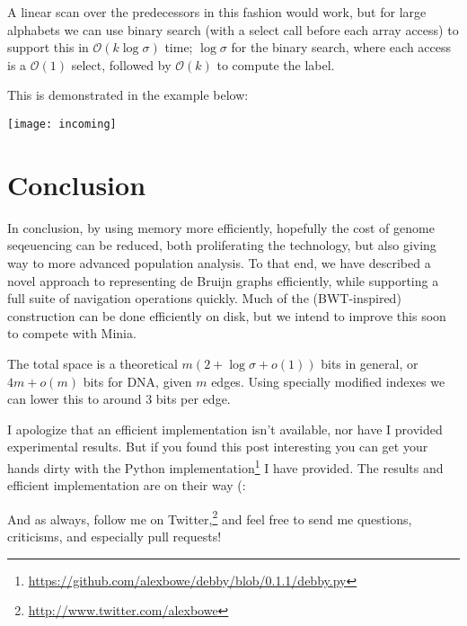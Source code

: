A linear scan over the predecessors in this fashion would work, but for large alphabets we can use binary search (with a select call before each array access) to support this in $\mathcal{O}(k\log\sigma)$ time; $\log\sigma$ for the binary search, where each access is a $\mathcal{O}(1)$ select, followed by $\mathcal{O}(k)$ to compute the label.

This is demonstrated in the example below:

\medskip\centerline{\texttt{[image: incoming]}}\medskip

\section{Conclusion}\label{bl-sec:conc}

In conclusion, by using memory more efficiently, hopefully the cost of genome seqeuencing can be reduced, both proliferating the technology, but also giving way to more advanced population analysis. To that end, we have described a novel approach to representing de Bruijn graphs efficiently, while supporting a full suite of navigation operations quickly. Much of the (BWT-inspired) construction can be done efficiently on disk, but we intend to improve this soon to compete with Minia.

The total space is a theoretical $m(2 + \log{\sigma} + o(1))$ bits in general, or $4m + o(m)$ bits for DNA, given $m$ edges. Using specially modified indexes we can lower this to around 3 bits per edge.

I apologize that an efficient implementation isn't available, nor have I provided experimental results. But if you found this post interesting you can get your hands dirty with the Python implementation\footnote{\url{https://github.com/alexbowe/debby/blob/0.1.1/debby.py}} I have provided. The results and efficient implementation are on their way (:

And as always, follow me on Twitter,\footnote{\url{http://www.twitter.com/alexbowe}} and feel free to send me questions, criticisms, and especially pull requests!